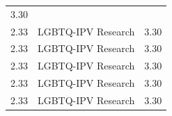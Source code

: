 \documentclass[]{tufte-handout}
\begin{document}
\begin{longtable}[]{@{}lll@{}}
\begin{minipage}[t]{0.08\columnwidth}
3.30\strut
\end{minipage}\tabularnewline
\begin{minipage}[t]{0.09\columnwidth}\raggedright\strut
2.33\strut
\end{minipage} & \begin{minipage}[t]{0.27\columnwidth}\raggedright\strut
LGBTQ-IPV Research\strut
\end{minipage} & \begin{minipage}[t]{0.08\columnwidth}\raggedright\strut
3.30\strut
\end{minipage}\tabularnewline
\begin{minipage}[t]{0.09\columnwidth}\raggedright\strut
2.33\strut
\end{minipage} & \begin{minipage}[t]{0.27\columnwidth}\raggedright\strut
LGBTQ-IPV Research\strut
\end{minipage} & \begin{minipage}[t]{0.08\columnwidth}\raggedright\strut
3.30\strut
\end{minipage}\tabularnewline
\begin{minipage}[t]{0.09\columnwidth}\raggedright\strut
2.33\strut
\end{minipage} & \begin{minipage}[t]{0.27\columnwidth}\raggedright\strut
LGBTQ-IPV Research\strut
\end{minipage} & \begin{minipage}[t]{0.08\columnwidth}\raggedright\strut
3.30\strut
\end{minipage}\tabularnewline
\begin{minipage}[t]{0.09\columnwidth}\raggedright\strut
2.33\strut
\end{minipage} & \begin{minipage}[t]{0.27\columnwidth}\raggedright\strut
LGBTQ-IPV Research\strut
\end{minipage} & \begin{minipage}[t]{0.08\columnwidth}\raggedright\strut
3.30\strut
\end{minipage}\tabularnewline
\begin{minipage}[t]{0.09\columnwidth}\raggedright\strut
2.33\strut
\end{minipage} & \begin{minipage}[t]{0.27\columnwidth}\raggedright\strut
LGBTQ-IPV Research\strut
\end{minipage} & \begin{minipage}[t]{0.08\columnwidth}\raggedright\strut
3.30\strut

\end{minipage}
\end{longtable}
\end{document}
